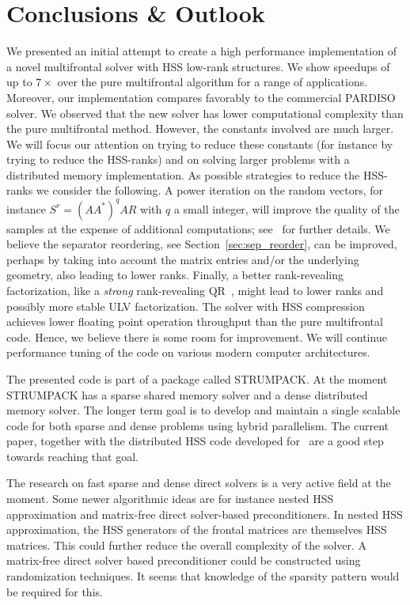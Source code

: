 \documentclass{article}
\begin{document}
\section{Conclusions \& Outlook}\label{sec:conclusions}
We presented an initial attempt to create a high performance
implementation of a novel multifrontal solver with HSS low-rank
structures. We show speedups of up to $7\times$ over the pure
multifrontal algorithm for a range of applications. Moreover, our
implementation compares favorably to the commercial PARDISO solver. We
observed that the new solver has lower computational complexity than
the pure multifrontal method. However, the constants involved are much
larger. We will focus our attention on trying to reduce these
constants (for instance by trying to reduce the HSS-ranks) and on
solving larger problems with a distributed memory implementation. As
possible strategies to reduce the HSS-ranks we consider the
following. A power iteration on the random vectors, for instance $S^r
= \left( A A^* \right)^q A R$ with $q$ a small integer, will improve
the quality of the samples at the expense of additional computations;
see~\cite{halko2011finding} for further details. We believe the
separator reordering, see Section~\ref{sec:sep_reorder}, can be
improved, perhaps by taking into account the matrix entries and/or the
underlying geometry, also leading to lower ranks. Finally, a better
rank-revealing factorization, like a \emph{strong} rank-revealing
QR~\cite{gu1996efficient}, might lead to lower ranks and possibly more
stable ULV factorization. The solver with HSS compression achieves
lower floating point operation throughput than the pure multifrontal
code. Hence, we believe there is some room for improvement. We will
continue performance tuning of the code on various modern computer
architectures.

The presented code is part of a package called STRUMPACK. At the
moment STRUMPACK has a sparse shared memory solver and a dense
distributed memory solver. The longer term goal is to develop and
maintain a single scalable code for both sparse and dense problems
using hybrid parallelism. The current paper, together with the
distributed HSS code developed for~\cite{FHR} are a good step towards
reaching that goal.

The research on fast sparse and dense direct solvers is a very active
field at the moment. Some newer algorithmic ideas are for instance
nested HSS approximation and matrix-free direct solver-based
preconditioners. In nested HSS approximation, the HSS generators of
the frontal matrices are themselves HSS matrices. This could further
reduce the overall complexity of the solver. A matrix-free direct
solver based preconditioner could be constructed using randomization
techniques. It seems that knowledge of the sparsity pattern would be
required for this.
\end{document}
